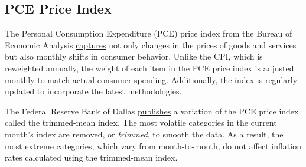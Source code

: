 \subsection*{PCE Price Index}
\hypertarget{prpce}{\label{prpce}}
\begin{minipage}{0.76\textwidth}
\small The Personal Consumption Expenditure (PCE) price index from the Bureau of Economic Analysis \href{https://www.bea.gov/data/personal-consumption-expenditures-price-index}{captures} not only changes in the prices of goods and services but also monthly shifts in consumer behavior. Unlike the CPI, which is reweighted annually, the weight of each item in the PCE price index is adjusted monthly to match actual consumer spending. Additionally, the index is regularly updated to incorporate the latest methodologies.


\vspace{1mm}

\vspace{4.5cm}

\hspace{5mm} 

\vspace{5mm}

\small The Federal Reserve Bank of Dallas \href{https://www.dallasfed.org/research/pce}{publishes} a variation of the PCE price index called the trimmed-mean index. The most volatile categories in the current month's index are removed, or \textit{trimmed}, to smooth the data. As a result, the most extreme categories, which vary from month-to-month, do not affect inflation rates calculated using the trimmed-mean index. 


\end{minipage}

